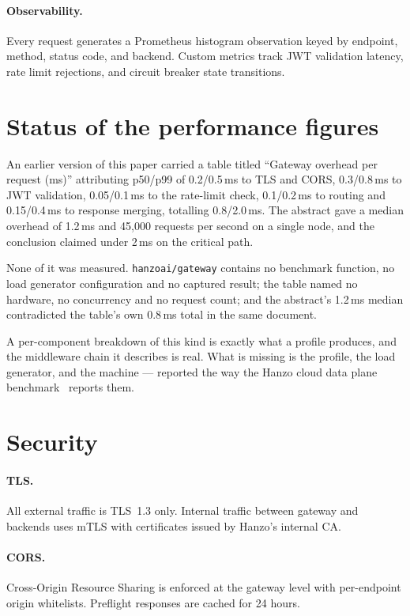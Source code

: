 \documentclass[11pt,twocolumn]{article}
\begin{document}
\paragraph{Observability.} Every request generates a Prometheus histogram observation keyed by endpoint, method, status code, and backend. Custom metrics track JWT validation latency, rate limit rejections, and circuit breaker state transitions.

\section{Status of the performance figures}
\label{sec:figures}

An earlier version of this paper carried a table titled ``Gateway overhead per
request (ms)'' attributing p50/p99 of 0.2/0.5\,ms to TLS and CORS, 0.3/0.8\,ms
to JWT validation, 0.05/0.1\,ms to the rate-limit check, 0.1/0.2\,ms to routing
and 0.15/0.4\,ms to response merging, totalling 0.8/2.0\,ms. The abstract gave a
median overhead of 1.2\,ms and 45{,}000 requests per second on a single node,
and the conclusion claimed under 2\,ms on the critical path.

None of it was measured. \texttt{hanzoai/gateway} contains no benchmark
function, no load generator configuration and no captured result; the table
named no hardware, no concurrency and no request count; and the abstract's
1.2\,ms median contradicted the table's own 0.8\,ms total in the same document.

A per-component breakdown of this kind is exactly what a profile produces, and
the middleware chain it describes is real. What is missing is the profile, the
load generator, and the machine --- reported the way the Hanzo cloud data plane
benchmark~\cite{clouddataplane} reports them.

\section{Security}

\paragraph{TLS.} All external traffic is TLS~1.3 only. Internal traffic between gateway and backends uses mTLS with certificates issued by Hanzo's internal CA.

\paragraph{CORS.} Cross-Origin Resource Sharing is enforced at the gateway level with per-endpoint origin whitelists. Preflight responses are cached for 24 hours.
\end{document}
